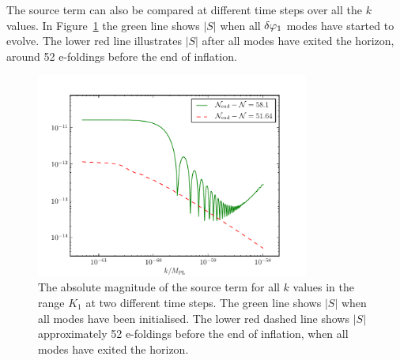 The source term can also be compared at different time steps over all the $k$ values.
In Figure~\ref{fig:src-3ns} the green
line shows $|S|$ when all $\delta\varphi_{1}$ modes have started to evolve. The lower
red line illustrates $|S|$
after all modes have exited the horizon, around 52 e-foldings before the end of
inflation.
% 
\begin{figure}[htbp]
\centering
\includegraphics[width=0.8\textwidth]{numerical/graphs/src_3ns-large}
\caption[Source Term at Two Different Times]{The absolute magnitude of the source 
term for all $k$ values in the range $K_1$ at two different time steps. The green line shows
$|S|$ when all modes have been initialised. The lower red dashed line shows $|S|$ approximately 
52 e-foldings before the end of inflation, when all modes have
exited the horizon.}
\label{fig:src-3ns}
\end{figure}
% 




